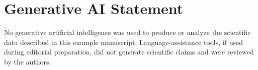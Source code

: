 \section{Generative AI Statement}

No generative artificial intelligence was used to produce or analyze the scientific data described in this example manuscript. Language-assistance tools, if used during editorial preparation, did not generate scientific claims and were reviewed by the authors.
